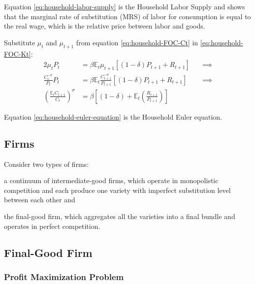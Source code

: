 \documentclass[
	thesis.tex
	]{subfiles}
\begin{document}
Equation \ref{eq:household-labor-supply} is the Household Labor Supply and shows that the marginal rate of substitution (MRS) of labor for consumption is equal to the real wage, which is the relative price between labor and goods.

Substitute $\mu_t$ and $\mu_{t+1}$ from equation \ref{eq:household-FOC-Ct} in \ref{eq:household-FOC-Kt}:
\begin{alignat}{2}
	\mu_t P_t & = \beta \mathbb{E}_t \mu_{t+1} [(1-\delta) P_{t+1} + R_{t+1}] \quad &\implies \nonumber \\
	\frac{C_t^{-\sigma}}{P_t} P_t & = \beta \mathbb{E}_t \frac{C_{t+1}^{-\sigma}}{P_{t+1}} [(1-\delta) P_{t+1} + R_{t+1}] &\implies \nonumber \\
	\left( \frac{\mathbb{E}_t C_{t+1}}{C_t} \right)^\sigma & = \beta \left[ (1-\delta) + \mathbb{E}_t \left(\frac{R_{t+1}}{P_{t+1}}\right) \right] \label{eq:household-euler-equation}
\end{alignat}

Equation \ref{eq:household-euler-equation} is the Household Euler equation.


\subsection*{Firms}

Consider two types of firms: 
\begin{enumerate*}[label=(\arabic*)]
	\item a continuum of intermediate-good firms, which operate in monopolistic competition and each produce one variety with imperfect substitution level between each other and
	
	\item the final-good firm, which aggregates all the varieties into a final bundle and operates in perfect competition.
\end{enumerate*}


\subsection{Final-Good Firm}

\subsubsection*{Profit Maximization Problem}
\end{document}

